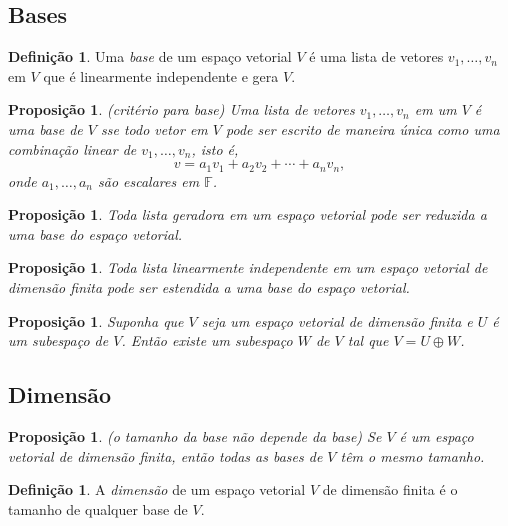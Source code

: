 \documentclass[12pt]{article}
\theoremstyle{plain}
\newtheorem{prop}[thm]{Proposição}
\theoremstyle{definition}
\newtheorem{defn}[thm]{Definição}
\theoremstyle{remark}
\begin{document}
\subsection{Bases}
\begin{defn}
    Uma \emph{base} de um espaço vetorial \(V\) é uma lista de vetores \(v_1, \ldots, v_n\) em \(V\) que é linearmente independente e gera \(V\).
\end{defn}

\begin{prop} (critério para base)
    Uma lista de vetores \(v_1, \ldots, v_n\) em um \(V\) é uma base de \(V\) sse todo vetor em \(V\) pode ser escrito de maneira única como uma combinação linear de \(v_1, \ldots, v_n\), isto é,
    \begin{equation}
        v = a_1 v_1 + a_2 v_2 + \cdots + a_n v_n,
    \end{equation}
    \noindent onde \(a_1, \ldots, a_n\) são escalares em \(\mathbb{F}\).
\end{prop}

\begin{prop}
    Toda lista geradora em um espaço vetorial pode ser reduzida a uma base do espaço vetorial.
\end{prop}

\begin{prop}
    Toda lista linearmente independente em um espaço vetorial de dimensão finita pode ser estendida a uma base do espaço vetorial.
\end{prop}

\begin{prop}
    Suponha que \(V\) seja um espaço vetorial de dimensão finita e \(U\) é um subespaço de \(V\). Então existe um subespaço \(W\) de \(V\) tal que \(V = U \oplus W\).
\end{prop}

\subsection{Dimensão}
\begin{prop} (o tamanho da base não depende da base)
    Se \(V\) é um espaço vetorial de dimensão finita, então todas as bases de \(V\) têm o mesmo tamanho.
\end{prop}

\begin{defn}
    A \emph{dimensão} de um espaço vetorial \(V\) de dimensão finita é o tamanho de qualquer base de \(V\).
\end{defn}
\end{document}
